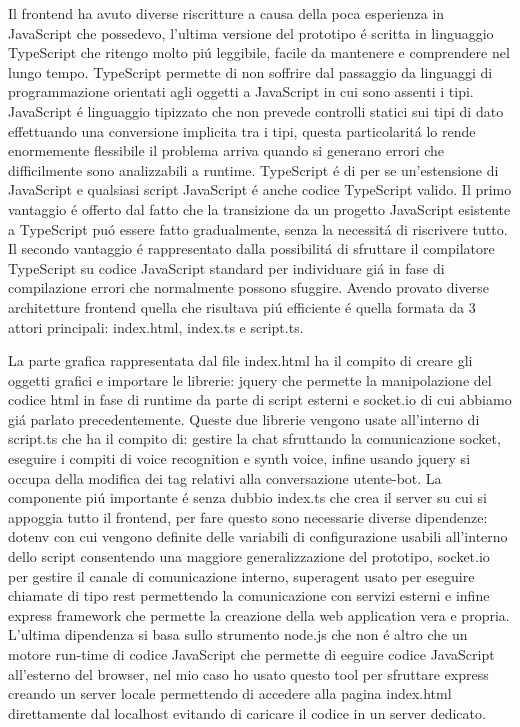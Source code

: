 Il frontend ha avuto diverse riscritture a causa della poca esperienza in JavaScript che possedevo, l'ultima versione del prototipo \'e scritta in linguaggio TypeScript che ritengo molto pi\'u leggibile, facile da mantenere e comprendere nel lungo tempo. 
TypeScript permette di non soffrire dal passaggio da linguaggi di programmazione orientati agli oggetti a JavaScript in cui sono assenti i tipi. JavaScript \'e linguaggio tipizzato che non prevede controlli statici sui tipi di dato effettuando una conversione implicita tra i tipi, questa particolarit\'a lo rende enormemente flessibile il problema arriva quando si generano errori che difficilmente sono analizzabili a runtime. 
TypeScript \'e di per se un'estensione di JavaScript e qualsiasi script JavaScript \'e anche codice TypeScript valido. Il primo vantaggio \'e offerto dal fatto che la transizione da un progetto JavaScript esistente a TypeScript pu\'o essere fatto gradualmente, senza la necessit\'a di riscrivere tutto. Il secondo vantaggio \'e rappresentato dalla possibilit\'a di sfruttare il compilatore TypeScript su codice JavaScript standard per individuare gi\'a in fase di compilazione errori che normalmente possono sfuggire.
Avendo provato diverse architetture frontend quella che risultava pi\'u efficiente \'e quella formata da 3 attori principali: index.html, index.ts e script.ts.

La parte grafica rappresentata dal file index.html ha il compito di creare gli oggetti grafici e importare le librerie: jquery che permette la manipolazione del codice html in fase di runtime da parte di script esterni e socket.io di cui abbiamo gi\'a parlato precedentemente.
Queste due librerie vengono usate all'interno di script.ts che ha il compito di: gestire la chat sfruttando la comunicazione socket, eseguire i compiti di voice recognition e synth voice, infine usando jquery si occupa della modifica dei tag relativi alla conversazione utente-bot. 
La componente pi\'u importante \'e senza dubbio index.ts che crea il server su cui si appoggia tutto il frontend, per fare questo sono necessarie diverse dipendenze: dotenv con cui vengono definite delle variabili di configurazione usabili all'interno dello script consentendo una maggiore generalizzazione del prototipo, socket.io per gestire il canale di comunicazione interno, superagent usato per eseguire chiamate di tipo rest permettendo la comunicazione con servizi esterni e infine express framework che permette la creazione della web application vera e propria.
L'ultima dipendenza si basa sullo strumento node.js che non \'e altro che un motore run-time di codice JavaScript che permette di eeguire codice JavaScript all'esterno del browser, nel mio caso ho usato questo tool per sfruttare express creando un server locale permettendo di accedere alla pagina index.html direttamente dal localhost evitando di caricare il codice in un server dedicato.  
